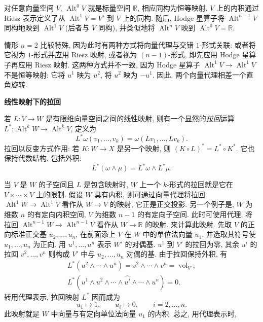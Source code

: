 对任意向量空间 $V$, $\operatorname{Alt}^0V$ 就是标量空间 $\mathbb R$, 相应同构为恒等映射. $V$ 上的内积通过 Riesz 表示定义了从 $\operatorname{Alt}^1V=V'$ 到 $V$ 上的同构. 随后, Hodge 星算子将 $\operatorname{Alt}^{n-1}V$ 同构地映到 $\operatorname{Alt}^1V$ (后者与 $V$ 同构), 并类似地将 $\operatorname{Alt}^nV$ 映到 $\operatorname{Alt}^0V=\mathbb R$.

情形 $n=2$ 比较特殊, 因为此时有两种方式将向量代理与交错 $1$-形式关联: 或者将它视为 $1$-形式并应用 Riesz 映射, 或者视为 $(n-1)$-形式, 即先应用 Hodge 星算子再应用 Riesz 映射. 这两种方式并不一致, 因为 Hodge 星算子 $\operatorname{Alt}^1V\to\operatorname{Alt}^1V$ 不是恒等映射: 它将 $u^1$ 映为 $u^2$, 将 $u^2$ 映为 $-u^1$. 因此, 两个向量代理相差一个直角旋转.

\medskip\noindent\textbf{{线性映射下的拉回}}\par
若 $L:V\to W$ 是有限维向量空间之间的线性映射, 则有一个显然的\emph{拉回}运算 $L^*:\operatorname{Alt}^kW\to\operatorname{Alt}^kV$, 定义为
\begin{equation}\label{eq:linear-pullback-definition}
L^*\omega(v_1,\ldots,v_k)=\omega(Lv_1,\ldots,Lv_k).
\end{equation}
拉回以反变方式作用: 若 $K:W\to X$ 是另一个映射, 则 $(K\circ L)^*=L^*\circ K^*$. 它也保持代数结构, 包括外积:
\begin{equation}\label{eq:linear-pullback-wedge}
L^*(\omega\wedge\mu)=L^*\omega\wedge L^*\mu.
\end{equation}

当 $V$ 是 $W$ 的子空间且 $L$ 是包含映射时, $W$ 上一个 $k$-形式的拉回就是它在 $V\times\cdots\times V$ 上的限制. 假设 $W$ 具有内积, 则可通过向量代理将拉回 $\operatorname{Alt}^1W\to\operatorname{Alt}^1V$ 看作从 $W\to V$ 的映射, 它正是正交投影. 另一个例子是, $W$ 为维数 $n$ 的有定向内积空间, $V$ 为维数 $n-1$ 的有定向子空间. 此时可使用代理, 将拉回 $\operatorname{Alt}^{n-1}W\to\operatorname{Alt}^{n-1}V$ 看作从 $W\to\mathbb R$ 的映射. 来计算此映射. 先取 $V$ 的正向标准正交基 $u_2,\ldots,u_n$, 在前面添上 $V$ 在 $W$ 中的单位法向量 $u_1$, 并选取其符号使 $u_1,\ldots,u_n$ 为正向. 用 $u^1,\ldots,u^n$ 表示 $W'$ 的对偶基. $u^1$ 到 $V'$ 的拉回为零, 其余 $u^i$ 的拉回 $v^2,\ldots,v^n$ 则构成 $V'$ 中与 $u_2,\ldots,u_n$ 对偶的基. 由于拉回保持外积, 有
\[
\begin{gathered}
L^*(u^2\wedge\cdots\wedge u^n)=v^2\wedge\cdots\wedge v^n=\operatorname{vol}_V,\\
L^*(u^1\wedge u^2\wedge\cdots\wedge\widehat{u^i}\wedge\cdots\wedge u^n)=0.
\end{gathered}
\]
转用代理表示, 拉回映射 $L^*$ 因而成为
\[
u_1\mapsto1,\qquad u_i\mapsto0,\qquad i=2,\ldots,n.
\]
此映射就是 $W$ 中向量与有定向单位法向量 $u_1$ 的内积. 总之, 用代理表示时,

